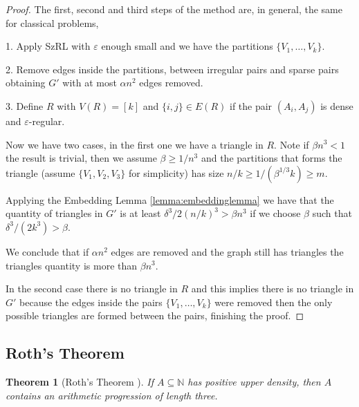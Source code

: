 \documentclass[12pt,twoside,a4paper,bibliography=totocnumbered]{book}
\numberwithin{equation}{section}
\newtheorem{theorem}             {Theorem}[section]
\theoremstyle{remark}
\begin{document}
\begin{proof}
The first, second and third steps of the method are, in general, the same for classical problems,

1. Apply SzRL with $\varepsilon$ enough small and we have the partitions $\{V_1, \ldots , V_k\}$.

2. Remove edges inside the partitions, between irregular pairs and sparse pairs obtaining $G'$ with at most $\alpha n^2$ edges removed.

3. Define $R$ with $V(R) = [k]$ and $\{i,j\} \in E(R) $ if  the pair $(A_i, A_j)$ is dense and $\varepsilon$-regular.

Now we have two cases, in the first one we have a triangle in $R$. Note if $\beta n^3 < 1$ the result is trivial, then we assume $\beta \geq 1/n^3$ and the partitions that forms the triangle (assume $\{V_1, V_2, V_3\}$ for simplicity) has size $n/k \geq 1/(\beta ^{1/3} k) \geq m$.

Applying the Embedding Lemma \ref{lemma:embeddinglemma} we have that the quantity of triangles in $G'$ is at least $\delta ^3 /2 (n/k)^3 > \beta n^3$ if we choose $\beta$ such that $\delta ^3 / (2k^3) > \beta$.

We conclude that if $\alpha n^2$ edges are removed and the graph still has triangles the triangles quantity is more than $\beta n^3$.

In the second case there is no triangle in $R$ and this implies there is no triangle in $G'$ because the edges inside the pairs $\{V_1, \ldots , V_k\}$ were removed then the only possible triangles are formed between the pairs, finishing the proof.
\end{proof}


\subsection{Roth's Theorem}

\begin{theorem}[{Roth's Theorem \cite{Ro53}}] If $A \subseteq \mathbb{N}$ has positive upper density, then $A$ contains an arithmetic progression of length three. 
\end{theorem}
\end{document}
